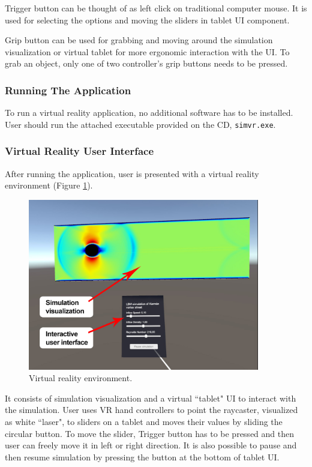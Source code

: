 Trigger button can be thought of as left click on traditional computer mouse. It is used for selecting the options and moving the sliders in tablet UI component.

Grip button can be used for grabbing and moving around the simulation visualization or virtual tablet for more ergonomic interaction with the UI. To grab an object, only one of two controller's grip buttons needs to be pressed.

\subsubsection*{Running The Application}

To run a virtual reality application, no additional software has to be installed. User should run the attached executable provided on the CD, \texttt{simvr.exe}.

\subsubsection*{Virtual Reality User Interface}

After running the application, user is presented with a virtual reality environment (Figure \ref{fig:ui-annotated}).

\begin{figure}[!ht]
	\centering
	\includegraphics[width=0.9\textwidth]{figures/ui-annotated.jpg}
	\caption{Virtual reality environment.}
	\label{fig:ui-annotated}
\end{figure}

It consists of simulation visualization and a virtual ``tablet" UI to interact with the simulation. User uses VR hand controllers to point the raycaster, visualized as white ``laser", to sliders on a tablet and moves their values by sliding the circular button. To move the slider, Trigger button has to be pressed and then user can freely move it in left or right direction. It is also possible to pause and then resume simulation by pressing the button at the bottom of tablet UI.

